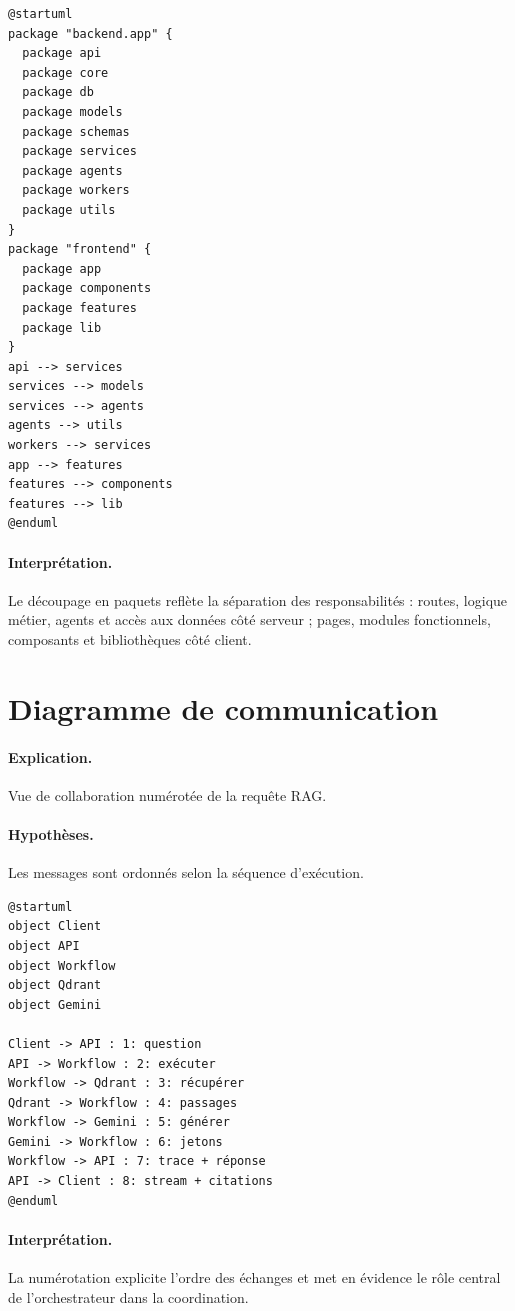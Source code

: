 \begin{lstlisting}[style=plantuml,caption={Diagramme de paquets},label={lst:pkg}]
@startuml
package "backend.app" {
  package api
  package core
  package db
  package models
  package schemas
  package services
  package agents
  package workers
  package utils
}
package "frontend" {
  package app
  package components
  package features
  package lib
}
api --> services
services --> models
services --> agents
agents --> utils
workers --> services
app --> features
features --> components
features --> lib
@enduml
\end{lstlisting}

\paragraph{Interprétation.} Le découpage en paquets reflète la séparation des
responsabilités : routes, logique métier, agents et accès aux données côté
serveur ; pages, modules fonctionnels, composants et bibliothèques côté client.

\section{Diagramme de communication}
\paragraph{Explication.} Vue de collaboration numérotée de la requête RAG.
\paragraph{Hypothèses.} Les messages sont ordonnés selon la séquence
d'exécution.

\begin{lstlisting}[style=plantuml,caption={Diagramme de communication — requête RAG},label={lst:comm}]
@startuml
object Client
object API
object Workflow
object Qdrant
object Gemini

Client -> API : 1: question
API -> Workflow : 2: exécuter
Workflow -> Qdrant : 3: récupérer
Qdrant -> Workflow : 4: passages
Workflow -> Gemini : 5: générer
Gemini -> Workflow : 6: jetons
Workflow -> API : 7: trace + réponse
API -> Client : 8: stream + citations
@enduml
\end{lstlisting}

\paragraph{Interprétation.} La numérotation explicite l'ordre des échanges et met
en évidence le rôle central de l'orchestrateur dans la coordination.

